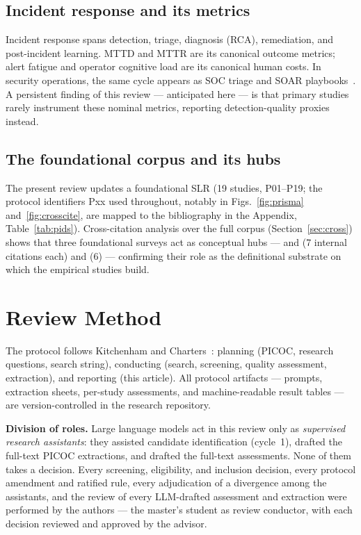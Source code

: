\documentclass{ieeeaccess}
\begin{document}
\subsection{Incident response and its metrics}
Incident response spans detection, triage, diagnosis (RCA), remediation,
and post-incident learning. MTTD and MTTR are its canonical outcome
metrics; alert fatigue and operator cognitive load are its canonical
human costs. In security operations, the same cycle appears as SOC
triage and SOAR playbooks~\cite{P28,P79}. A persistent finding of this
review --- anticipated here --- is that primary studies rarely
instrument these nominal metrics, reporting detection-quality proxies
instead.

\subsection{The foundational corpus and its hubs}
The present review updates a foundational SLR (19 studies, P01--P19;
the protocol identifiers Pxx used throughout, notably in
Figs.~\ref{fig:prisma} and~\ref{fig:crosscite}, are mapped to the
bibliography in the Appendix, Table~\ref{tab:pids}).
Cross-citation analysis over the full corpus (Section~\ref{sec:cross})
shows that three foundational surveys act as conceptual hubs ---
\cite{P10} and \cite{P14} (7 internal citations each) and \cite{P09} (6)
--- confirming their role as the definitional substrate on which the
empirical studies build.

\section{Review Method}
\label{sec:method}

The protocol follows Kitchenham and Charters~\cite{kitchenham2007}: planning
(PICOC, research questions, search string), conducting (search,
screening, quality assessment, extraction), and reporting (this
article). All protocol artifacts --- prompts, extraction sheets,
per-study assessments, and machine-readable result tables --- are
version-controlled in the research repository.

\textbf{Division of roles.} Large language models act in this review
only as \emph{supervised research assistants}: they assisted candidate
identification (cycle~1), drafted the full-text PICOC extractions, and
drafted the full-text assessments. None of them takes a decision. Every
screening, eligibility, and inclusion decision, every protocol
amendment and ratified rule, every adjudication of a divergence among
the assistants, and the review of every LLM-drafted assessment and
extraction were performed by the authors --- the master's student as
review conductor, with each decision reviewed and approved by the
advisor.
\end{document}
